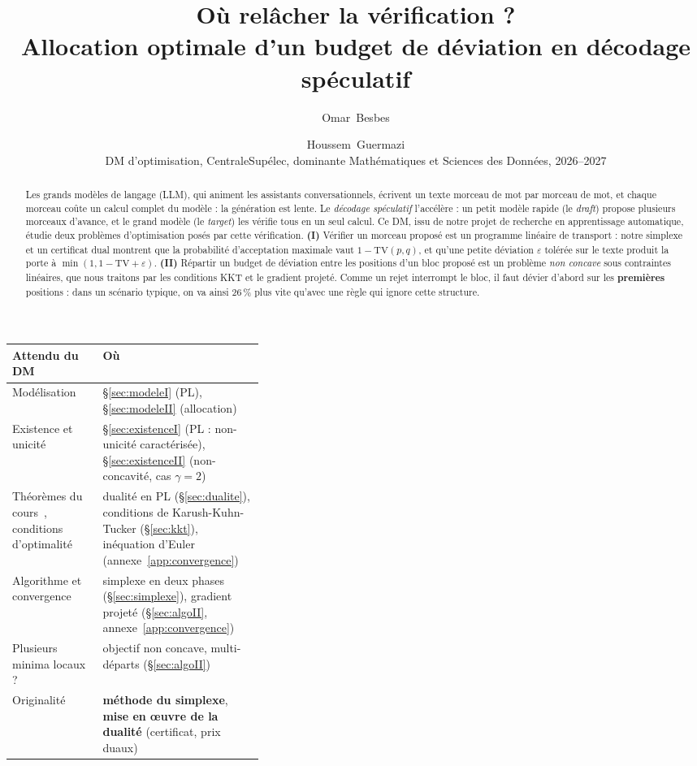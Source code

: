 \documentclass[11pt,a4paper]{article}
\title{\textbf{Où relâcher la vérification ?}\\[2pt]
\large Allocation optimale d'un budget de déviation en décodage spéculatif}
\author{Omar~Besbes \and Houssem~Guermazi\\[2pt]
\small DM d'optimisation, CentraleSupélec, dominante Mathématiques et Sciences des Données, 2026--2027}
\date{}
\newcommand{\TV}{\mathrm{TV}}
\theoremstyle{plain}
\theoremstyle{definition}
\begin{document}
\maketitle

\begin{abstract}
Les grands modèles de langage (LLM), qui animent les assistants conversationnels, écrivent un texte morceau de mot par morceau de mot, et chaque morceau coûte un calcul complet du modèle : la génération est lente.
Le \emph{décodage spéculatif} l'accélère : un petit modèle rapide (le \emph{draft}) propose plusieurs morceaux d'avance, et le grand modèle (le \emph{target}) les vérifie tous en un seul calcul.
Ce DM, issu de notre projet de recherche en apprentissage automatique, étudie deux problèmes d'optimisation posés par cette vérification.
\textbf{(I)} Vérifier un morceau proposé est un programme linéaire de transport : notre simplexe et un certificat dual montrent que la probabilité d'acceptation maximale vaut $1-\TV(p,q)$, et qu'une petite déviation $\varepsilon$ tolérée sur le texte produit la porte à $\min(1,1-\TV+\varepsilon)$.
\textbf{(II)} Répartir un budget de déviation entre les positions d'un bloc proposé est un problème \emph{non concave} sous contraintes linéaires, que nous traitons par les conditions KKT et le gradient projeté.
Comme un rejet interrompt le bloc, il faut dévier d'abord sur les \textbf{premières} positions : dans un scénario typique, on va ainsi 26\,\% plus vite qu'avec une règle qui ignore cette structure.
\end{abstract}

\begin{center}
\small
\begin{tabularx}{\linewidth}{@{}>{\raggedright}p{0.36\linewidth}X@{}}
\toprule
\textbf{Attendu du DM} & \textbf{Où} \\\midrule
Modélisation & §\ref{sec:modeleI} (PL), §\ref{sec:modeleII} (allocation)\\
Existence et unicité & §\ref{sec:existenceI} (PL : non-unicité caractérisée), §\ref{sec:existenceII} (non-concavité, cas $\gamma=2$)\\
Théorèmes du cours~\cite{allaire}, conditions d'optimalité & dualité en PL (§\ref{sec:dualite}), conditions de Karush-Kuhn-Tucker (§\ref{sec:kkt}), inéquation d'Euler (annexe~\ref{app:convergence})\\
Algorithme et convergence & simplexe en deux phases (§\ref{sec:simplexe}), gradient projeté (§\ref{sec:algoII}, annexe~\ref{app:convergence})\\
Plusieurs minima locaux ? & objectif non concave, multi-départs (§\ref{sec:algoII})\\
Originalité & \textbf{méthode du simplexe}, \textbf{mise en œuvre de la dualité} (certificat, prix duaux)\\
\bottomrule
\end{tabularx}
\end{center}
\end{document}

